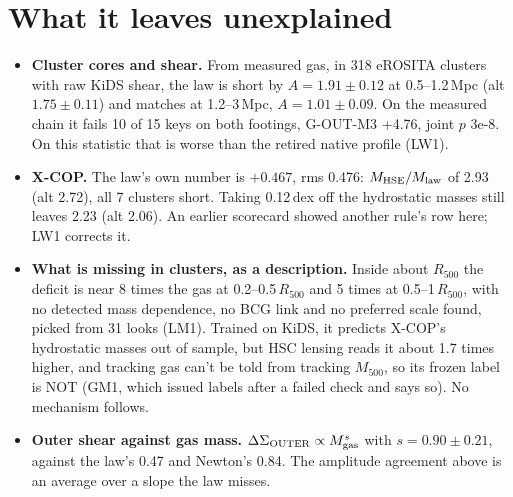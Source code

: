 \documentclass[10pt]{article}
\begin{document}
\begin{itemize}
\end{itemize}

\section{What it leaves unexplained}\label{sec:gaps}
\begin{itemize}
\item \textbf{Cluster cores and shear.} From measured gas, in 318 eROSITA clusters with raw KiDS shear, the law is short by $A=1.91\pm0.12$ at 0.5--1.2\,Mpc (alt $1.75\pm0.11$) and matches at 1.2--3\,Mpc, $A=1.01\pm0.09$. On the measured chain it fails 10 of 15 keys on both footings, G-OUT-M3 +4.76, joint $p$ 3e-8. On this statistic that is worse than the retired native profile (LW1).
\item \textbf{X-COP.} The law's own number is $+0.467$, rms 0.476: $M_{\rm HSE}/M_{\rm law}$ of 2.93 (alt 2.72), all 7 clusters short. Taking 0.12\,dex off the hydrostatic masses still leaves 2.23 (alt 2.06). An earlier scorecard showed another rule's row here; LW1 corrects it.
\item \textbf{What is missing in clusters, as a description.} Inside about $R_{500}$ the deficit is near 8 times the gas at 0.2--0.5\,$R_{500}$ and 5 times at 0.5--1\,$R_{500}$, with no detected mass dependence, no BCG link and no preferred scale found, picked from 31 looks (LM1). Trained on KiDS, it predicts X-COP's hydrostatic masses out of sample, but HSC lensing reads it about 1.7 times higher, and tracking gas can't be told from tracking $M_{500}$, so its frozen label is NOT (GM1, which issued labels after a failed check and says so). No mechanism follows.
\item \textbf{Outer shear against gas mass.} $\Delta\Sigma_{\rm OUTER}\propto M_{\rm gas}^{s}$ with $s=0.90\pm0.21$, against the law's 0.47 and Newton's 0.84. The amplitude agreement above is an average over a slope the law misses.

\end{itemize}
\end{document}

